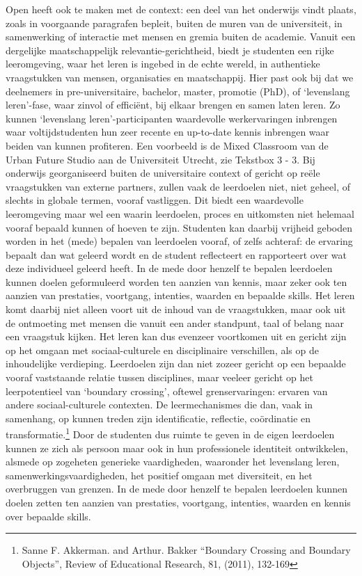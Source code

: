 \documentclass[empirical, authordate, ]{new-jote-article}
\begin{document}
	Open heeft ook te maken met de context: een deel van het onderwijs vindt plaats, zoals in voorgaande paragrafen bepleit, buiten de muren van de universiteit, in samenwerking of interactie met mensen en gremia buiten de academie. Vanuit een dergelijke maatschappelijk relevantie-gerichtheid, biedt je studenten een rijke leeromgeving, waar het leren is ingebed in de echte wereld, in authentieke vraagstukken van mensen, organisaties en maatschappij. Hier past ook bij dat we deelnemers in pre-universitaire, bachelor, master, promotie (PhD), of ‘levenslang leren'-fase, waar zinvol of efficiënt, bij elkaar brengen en samen laten leren. Zo kunnen ‘levenslang leren'-participanten waardevolle werkervaringen inbrengen waar voltijdstudenten hun zeer recente en up-to-date kennis inbrengen waar beiden van kunnen profiteren. Een voorbeeld is de Mixed Classroom van de Urban Future Studio aan de Universiteit Utrecht, zie Tekstbox 3 - 3. Bij onderwijs georganiseerd buiten de universitaire context of gericht op reële vraagstukken van externe partners, zullen vaak de leerdoelen niet, niet geheel, of slechts in globale termen, vooraf vastliggen. Dit biedt een waardevolle leeromgeving maar wel een waarin leerdoelen, proces en uitkomsten niet helemaal vooraf bepaald kunnen of hoeven te zijn. Studenten kan daarbij vrijheid geboden worden in het (mede) bepalen van leerdoelen vooraf, of zelfs achteraf: de ervaring bepaalt dan wat geleerd wordt en de student reflecteert en rapporteert over wat deze individueel geleerd heeft. In de mede door henzelf te bepalen leerdoelen kunnen doelen geformuleerd worden ten aanzien van kennis, maar zeker ook ten aanzien van prestaties, voortgang, intenties, waarden en bepaalde skills. Het leren komt daarbij niet alleen voort uit de inhoud van de vraagstukken, maar ook uit de ontmoeting met mensen die vanuit een ander standpunt, taal of belang naar een vraagstuk kijken. Het leren kan dus evenzeer voortkomen uit en gericht zijn op het omgaan met sociaal-culturele en disciplinaire verschillen, als op de inhoudelijke verdieping. Leerdoelen zijn dan niet zozeer gericht op een bepaalde vooraf vaststaande relatie tussen disciplines, maar veeleer gericht op het leerpotentieel van ‘boundary crossing', oftewel grenservaringen: ervaren van andere sociaal-culturele contexten. De leermechanismes die dan, vaak in samenhang, op kunnen treden zijn identificatie, reflectie, coördinatie en transformatie.\footnote{Sanne F. Akkerman. and Arthur. Bakker “Boundary Crossing and Boundary Objects”, Review of Educational Research, 81, (2011), 132-169} Door de studenten dus ruimte te geven in de eigen leerdoelen kunnen ze zich als persoon maar ook in hun professionele identiteit ontwikkelen, alsmede op zogeheten generieke vaardigheden, waaronder het levenslang leren, samenwerkingsvaardigheden, het positief omgaan met diversiteit, en het overbruggen van grenzen. In de mede door henzelf te bepalen leerdoelen kunnen doelen zetten ten aanzien van prestaties, voortgang, intenties, waarden en kennis over bepaalde skills.
\end{document}
